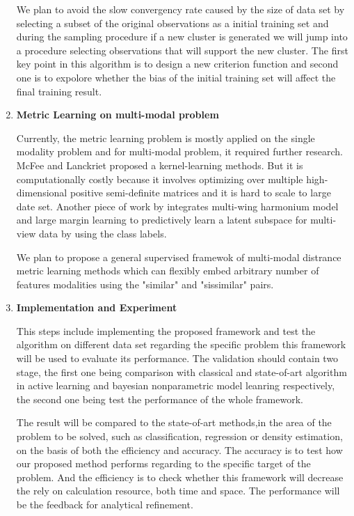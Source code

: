 \begin{enumerate}
 We plan to avoid the slow convergency rate caused by the size of data set by selecting a subset of the original observations as a initial training set and during the sampling procedure if a new cluster is generated we will jump into a procedure  selecting observations that will support the new cluster. The first key point in this algorithm is to design a new criterion function and second one is to expolore whether the bias of the initial training set will affect the final training result.
 
 \item \textbf{Metric Learning on multi-modal problem}
 
 Currently, the metric learning problem is mostly applied on the single modality problem and for multi-modal problem, it required further research. McFee and Lanckriet\cite{McFee2011} proposed a kernel-learning methods. But it is computationally costly because it involves optimizing over multiple high-dimensional positive semi-definite matrices and it is hard to scale to large date set. Another piece of work by \cite{Chen2010} integrates multi-wing harmonium model and large margin learning to predictively learn a latent subspace for multi-view data by using the class labels.
 
 We plan to propose a general supervised framewok of multi-modal distrance metric learning methods which can flexibly embed arbitrary number of features modalities using the "similar" and "sissimilar" pairs.
 \item \textbf{Implementation and Experiment}
 
 This steps include implementing the proposed framework and test the algorithm on different data set regarding the specific problem this framework will be used to evaluate its performance. The validation should contain two stage, the first one being comparison with classical and state-of-art algorithm in active learning and bayesian nonparametric model leanring respectively, the second one being test the performance of the whole framework.
 
 
 The result will be compared to the state-of-art methods,in the area of the problem to be solved, such as classification, regression or density estimation, on the basis of both the efficiency and accuracy. The accuracy is to test how our proposed method performs regarding to the specific target of the problem. And the efficiency is to check whether this framework will decrease the rely on calculation resource, both time and space. The performance will be the feedback for analytical refinement.
\end{enumerate}